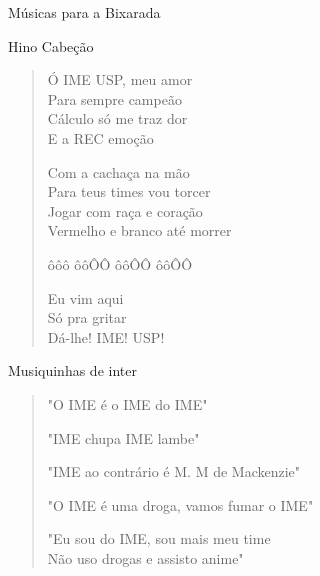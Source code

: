 \begin{secao}{Músicas para a Bixarada}

\begin{subsecao}{Hino Cabeção}
\begin{verse}

Ó IME USP, meu amor\\
Para sempre campeão\\
Cálculo só me traz dor\\
E a REC emoção

Com a cachaça na mão\\
Para teus times vou torcer\\
Jogar com raça e coração\\
Vermelho e branco até morrer

ôôô ôôÔÔ ôôÔÔ ôôÔÔ

Eu vim aqui\\
Só pra gritar\\
Dá-lhe! IME! USP!
\end{verse}
\end{subsecao}

\begin{subsecao}{Musiquinhas de inter}
\begin{verse}

"O IME é o IME do IME"

"IME chupa IME lambe"

"IME ao contrário é M. M de Mackenzie"

"O IME é uma droga, vamos fumar o IME"

"Eu sou do IME, sou mais meu time\\ 
\hspace{0.2cm}Não uso drogas e assisto anime"

\end{verse}
\end{subsecao}
\pagebreak




\end{secao}
